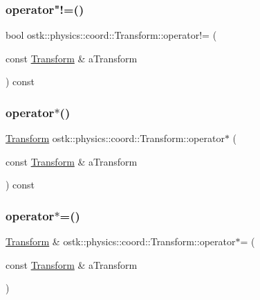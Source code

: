 \mbox{\label{classostk_1_1physics_1_1coord_1_1_transform_a2dc5d65fdd5c364df815e5fa8b1f4b74}} 
\subsubsection{\texorpdfstring{operator"!=()}{operator!=()}}
{\footnotesize\ttfamily bool ostk\+::physics\+::coord\+::\+Transform\+::operator!= (\begin{DoxyParamCaption}\item[{const \hyperlink{classostk_1_1physics_1_1coord_1_1_transform}{Transform} \&}]{a\+Transform }\end{DoxyParamCaption}) const}

\mbox{\label{classostk_1_1physics_1_1coord_1_1_transform_ad596e25498b79fd0a5ae9a338c9a44e8}} 
\subsubsection{\texorpdfstring{operator$\ast$()}{operator*()}}
{\footnotesize\ttfamily \hyperlink{classostk_1_1physics_1_1coord_1_1_transform}{Transform} ostk\+::physics\+::coord\+::\+Transform\+::operator$\ast$ (\begin{DoxyParamCaption}\item[{const \hyperlink{classostk_1_1physics_1_1coord_1_1_transform}{Transform} \&}]{a\+Transform }\end{DoxyParamCaption}) const}

\mbox{\label{classostk_1_1physics_1_1coord_1_1_transform_a63884c293c7f92e1a2fc0a33889dedc9}} 
\subsubsection{\texorpdfstring{operator$\ast$=()}{operator*=()}}
{\footnotesize\ttfamily \hyperlink{classostk_1_1physics_1_1coord_1_1_transform}{Transform} \& ostk\+::physics\+::coord\+::\+Transform\+::operator$\ast$= (\begin{DoxyParamCaption}\item[{const \hyperlink{classostk_1_1physics_1_1coord_1_1_transform}{Transform} \&}]{a\+Transform }\end{DoxyParamCaption})}

